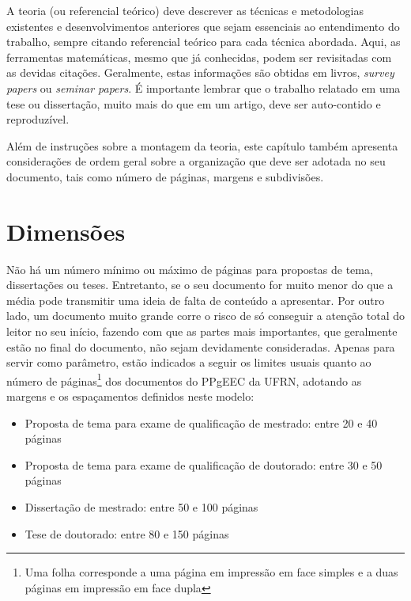 
\label{Cap:Teoria}

A teoria (ou referencial teórico) deve descrever as técnicas e metodologias existentes e desenvolvimentos anteriores que sejam essenciais ao entendimento do trabalho, sempre citando referencial teórico para cada técnica abordada. Aqui, as ferramentas matemáticas, mesmo que já conhecidas, podem ser revisitadas com as devidas citações. Geralmente, estas informações são obtidas em livros, \textit{survey papers} ou \textit{seminar papers}. É importante lembrar que o trabalho relatado em uma tese ou dissertação, muito mais do que em um artigo, deve ser auto-contido e  reproduzível.

Além de instruções sobre a montagem da teoria, este capítulo também apresenta considerações de ordem geral sobre a organização que deve ser adotada no seu documento, tais como número de
páginas, margens e subdivisões.

\section{Dimensões}
\label{dimensões}

Não há um número mínimo ou máximo de páginas para propostas de tema,
dissertações ou teses. Entretanto, se o seu documento for muito menor
do que a média pode transmitir uma ideia de falta de conteúdo a
apresentar. Por outro lado, um documento muito grande corre o risco de
só conseguir a atenção total do leitor no seu início, fazendo com que
as partes mais importantes, que geralmente estão no final do
documento, não sejam devidamente consideradas. Apenas para servir como
parâmetro, estão indicados a seguir os limites usuais quanto ao número
de páginas\footnote{Uma folha corresponde a uma página em impressão em
face simples e a duas páginas em impressão em face dupla} dos
documentos do PPgEEC da UFRN, adotando as margens e os espaçamentos
definidos neste modelo:
\begin{itemize}
\item Proposta de tema para exame de qualificação de mestrado:
entre 20 e 40 páginas
\item Proposta de tema para exame de qualificação de doutorado:
entre 30 e 50 páginas
\item Dissertação de mestrado:
entre 50 e 100 páginas
\item Tese de doutorado:
entre 80 e 150 páginas
\end{itemize}


